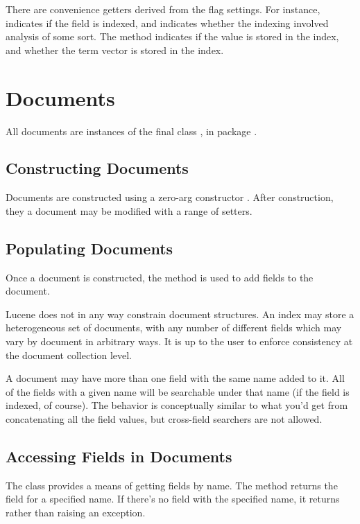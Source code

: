 There are convenience getters derived from the flag settings.  For
instance,  indicates if the field is indexed, and
 indicates whether the indexing involved analysis
of some sort.  The method  indicates if the value is
stored in the index, and  whether the term
vector is stored in the index.

\section{Documents}

All documents are instances of the final class , in
package .  

\subsection{Constructing Documents} 

Documents are constructed using a zero-arg constructor .
After construction, they a document may be modified with a range of
setters. 

\subsection{Populating Documents}

Once a document is constructed, the method  is
used to add fields to the document.  

Lucene does not in any way constrain document structures.  An index
may store a heterogeneous set of documents, with any number of
different fields which may vary by document in arbitrary ways.  It is
up to the user to enforce consistency at the document collection
level.  

A document may have more than one field with the same name added to
it.  All of the fields with a given name will be searchable under that
name (if the field is indexed, of course).  The behavior is conceptually
similar to what you'd get from concatenating all the field values,
but cross-field searchers are not allowed.  

\subsection{Accessing Fields in Documents}

The  class provides a means of getting fields by name.
The method  returns the field for a
specified name.  If there's no field with the specified name, it
returns  rather than raising an exception.

